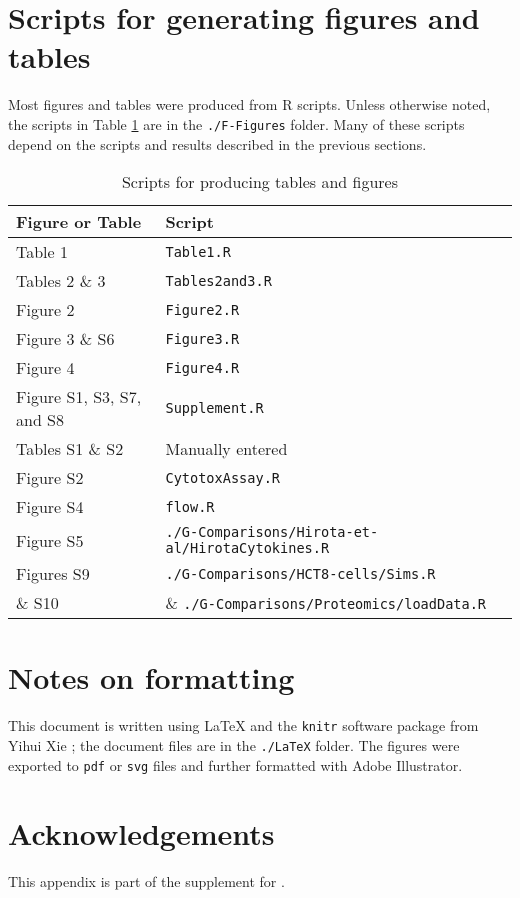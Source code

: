\section{Scripts for generating figures and tables}\label{S:Figures}

Most figures and tables were produced from R scripts.
Unless otherwise noted, the scripts in Table \ref{Ta:figureScripts} are in the
\texttt{./F-Figures} folder. Many of these scripts depend on the scripts
and results described in the previous sections.

\begin{table}[h]
  \begin{center}
    \begin{tabular}{ l l  }
      Figure or Table   &  Script   \\ \hline
      Table 1 & \texttt{Table1.R} \\
      Tables 2 \& 3 & \texttt{Tables2and3.R} \\
      Figure 2 & \texttt{Figure2.R} \\
      Figure 3 \& S6 & \texttt{Figure3.R} \\
      Figure 4 & \texttt{Figure4.R} \\
      Figure S1, S3, S7, and S8 & \texttt{Supplement.R} \\
      Tables S1 \& S2 & Manually entered \\
      Figure S2 & \texttt{CytotoxAssay.R} \\
      Figure S4 & \texttt{flow.R} \\
      Figure S5 & \texttt{./G-Comparisons/Hirota-et-al/HirotaCytokines.R} \\
      Figures S9 & \texttt{./G-Comparisons/HCT8-cells/Sims.R} \\
      \hspace{1cm} \& S10 & \& \texttt{./G-Comparisons/Proteomics/loadData.R}
    \end{tabular}
    \caption{Scripts for producing tables and figures}\label{Ta:figureScripts}
  \end{center}
\end{table}

\section{Notes on formatting}\label{S:Formatting}

This document is written using \LaTeX{} and the \texttt{knitr} software 
package from Yihui Xie \cite{Xie:2013wu}; the document files are in the \texttt{./LaTeX} folder.
The figures were exported to \texttt{pdf} or \texttt{svg} files and 
further formatted with Adobe Illustrator.

\section{Acknowledgements}
This appendix is part of the supplement for .




